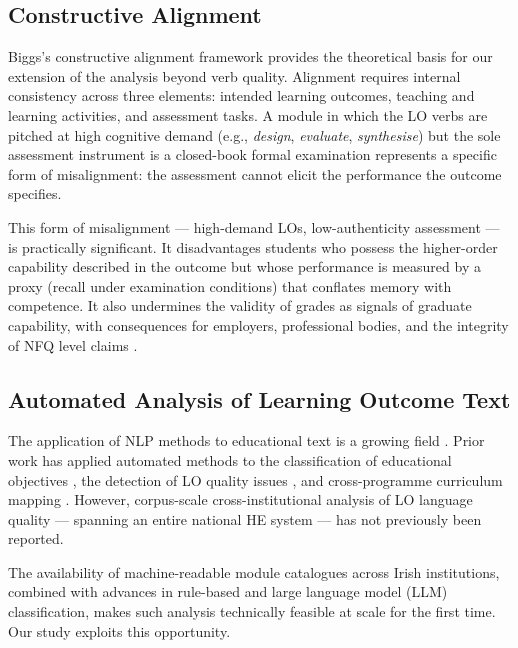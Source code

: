 \documentclass[12pt, a4paper]{article}
\begin{document}
\subsection{Constructive Alignment}

Biggs's constructive alignment framework \citep{biggs1996enhancing, biggs2011teaching}
provides the theoretical basis for our extension of the analysis beyond verb quality.
Alignment requires internal consistency across three elements: intended learning outcomes,
teaching and learning activities, and assessment tasks. A module in which the LO verbs
are pitched at high cognitive demand (e.g., \textit{design}, \textit{evaluate},
\textit{synthesise}) but the sole assessment instrument is a closed-book formal
examination represents a specific form of misalignment: the assessment cannot elicit
the performance the outcome specifies.

This form of misalignment --- high-demand LOs, low-authenticity assessment ---
is practically significant. It disadvantages students who possess the higher-order
capability described in the outcome but whose performance is measured by a proxy
(recall under examination conditions) that conflates memory with competence. It also
undermines the validity of grades as signals of graduate capability, with consequences
for employers, professional bodies, and the integrity of NFQ level claims
\citep{bloxham2007marking}.

\subsection{Automated Analysis of Learning Outcome Text}

The application of NLP methods to educational text is a growing field
\citep{demetriadis2018, zawacki2019systematic}. Prior work has applied
automated methods to the classification of educational objectives
\citep{khandelwal2021bloom, ullmann2019automated}, the detection of LO quality
issues \citep{chen2022automated}, and cross-programme curriculum mapping
\citep{shabani2012using}. However, corpus-scale cross-institutional analysis
of LO language quality --- spanning an entire national HE system --- has not
previously been reported.

The availability of machine-readable module catalogues across Irish institutions,
combined with advances in rule-based and large language model (LLM) classification,
makes such analysis technically feasible at scale for the first time. Our study
exploits this opportunity.
\end{document}
